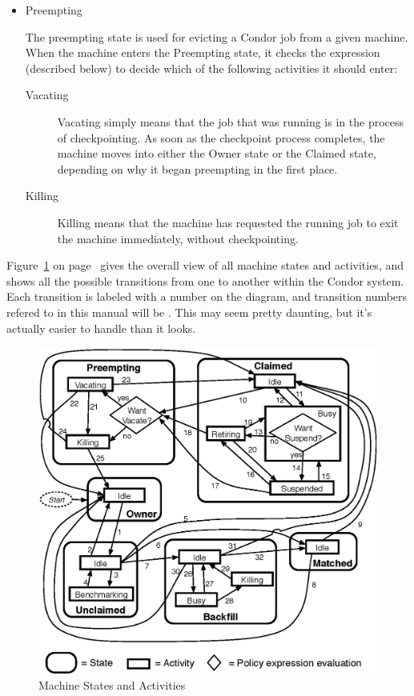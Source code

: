 \begin{itemize}
\begin{description}
\end{description}

\item Preempting

  The preempting state is used for evicting a Condor job from a given
  machine.  When the machine enters the Preempting state, it checks the
   expression (described below) to decide which of
  the following activities it should enter:

\begin{description}
  
\item[Vacating] Vacating simply means that the job that was running is
  in the process of checkpointing.  As soon as the checkpoint process
  completes, the machine moves into either the Owner state or the
  Claimed state, depending on why it began preempting in the first
  place.
  
\item[Killing] Killing means that the machine has requested the running
  job to exit the machine immediately, without checkpointing.

\end{description}

\end{itemize}

Figure~\ref{fig:machine-activities} on
page~\pageref{fig:machine-activities} gives the overall view of all
machine states and activities, and shows all the possible transitions
from one to another within the Condor system.  
Each transition is labeled with a number on the diagram, and
transition numbers refered to in this manual will be .  
This may seem pretty daunting, but it's actually easier to handle than
it looks.

\begin{figure}[hbt]
\centering
\includegraphics{admin-man/machine-activities.eps}
\caption{\label{fig:machine-activities}Machine States and Activities}
\end{figure}

